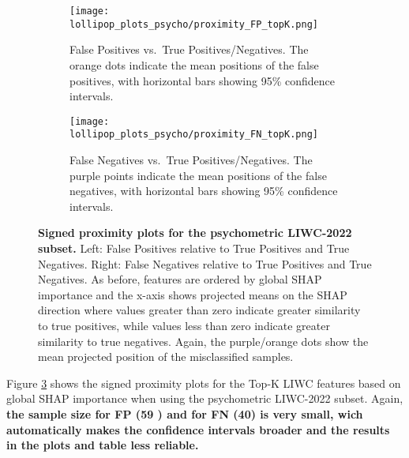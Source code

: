 \begin{figure}[H]
  \centering

  \begin{subfigure}[t]{0.49\textwidth}
    \centering
    \texttt{[image: lollipop\_plots\_psycho/proximity\_FP\_topK.png]}
    \caption{False Positives vs.\ True Positives/Negatives. The \textcolor{orange!70!black}{orange} dots indicate the mean positions of the false positives, with horizontal bars showing 95\% confidence intervals.}
    \label{fig:lollipop_fp_psycho}
  \end{subfigure}\hfill
  \begin{subfigure}[t]{0.49\textwidth}
    \centering
    \texttt{[image: lollipop\_plots\_psycho/proximity\_FN\_topK.png]}
    \caption{False Negatives vs.\ True Positives/Negatives. The \textcolor{purple!70!black}{purple points} indicate the mean positions of the false negatives, with horizontal bars showing 95\% confidence intervals.}
    \label{fig:lollipop_fn_psycho}
  \end{subfigure}

  \caption[Signed proximity plots for the psychometric LIWC-2022 subset.]{\textbf{Signed proximity plots for the psychometric LIWC-2022 subset.} 
  Left: False Positives relative to True Positives and True Negatives. 
  Right: False Negatives relative to True Positives and True Negatives. 
  As before, features are ordered by global SHAP importance and the x-axis shows projected means on the SHAP direction where values greater than zero indicate greater similarity to true positives, while values less than zero indicate greater similarity to true negatives. Again, the purple/orange dots show the mean projected position of the misclassified samples.}
  \label{fig:lollipop_psycho}
\end{figure}

Figure \ref{fig:lollipop_psycho} shows the signed proximity plots for the Top-K LIWC features based on global SHAP importance when using the psychometric LIWC-2022 subset. Again, \textbf{the sample size for FP (59 ) and for FN (40) is very small, wich automatically makes the confidence intervals broader and the results in the plots and table less reliable.} 

